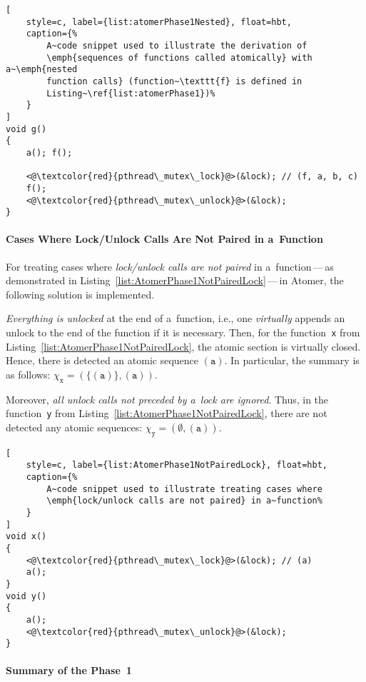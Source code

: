 \begin{lstlisting}[
    style=c, label={list:atomerPhase1Nested}, float=hbt,
    caption={%
        A~code snippet used to illustrate the derivation of
        \emph{sequences of functions called atomically} with a~\emph{nested
        function calls} (function~\texttt{f} is defined in
        Listing~\ref{list:atomerPhase1})%
    }
]
void g()
{
    a(); f();

    <@\textcolor{red}{pthread\_mutex\_lock}@>(&lock); // (f, a, b, c)
    f();
    <@\textcolor{red}{pthread\_mutex\_unlock}@>(&lock);
}
\end{lstlisting}

\paragraph{Cases Where Lock/Unlock Calls Are Not Paired in a~Function}

For treating cases where \emph{lock/unlock calls are not paired} in
a~function\,---\,as demonstrated in
Listing~\ref{list:AtomerPhase1NotPairedLock}\,---\,in Atomer, the
following solution is implemented.

\emph{Everything is unlocked} at the end of a~function, i.e.,
one \emph{virtually} appends an unlock to the end of the function if it is
necessary. Then, for the function~\texttt{x} from
Listing~\ref{list:AtomerPhase1NotPairedLock}, the atomic section is
virtually closed. Hence, there is detected an atomic sequence
$ (\mathtt{a}) $. In particular, the summary is as follows:
$ \chi_\mathtt{x} = (\{(\mathtt{a})\}, (\mathtt{a})) $.

Moreover, \emph{all unlock calls not preceded by a~lock are ignored}.
Thus, in the function~\texttt{y} from
Listing~\ref{list:AtomerPhase1NotPairedLock}, there are not detected
any atomic sequences: $ \chi_\mathtt{y} = (\emptyset, (\mathtt{a})) $.

\begin{lstlisting}[
    style=c, label={list:AtomerPhase1NotPairedLock}, float=hbt,
    caption={%
        A~code snippet used to illustrate treating cases where
        \emph{lock/unlock calls are not paired} in a~function%
    }
]
void x()
{
    <@\textcolor{red}{pthread\_mutex\_lock}@>(&lock); // (a)
    a();
}
void y()
{
    a();
    <@\textcolor{red}{pthread\_mutex\_unlock}@>(&lock);
}
\end{lstlisting}

\paragraph{Summary of the Phase~1}

